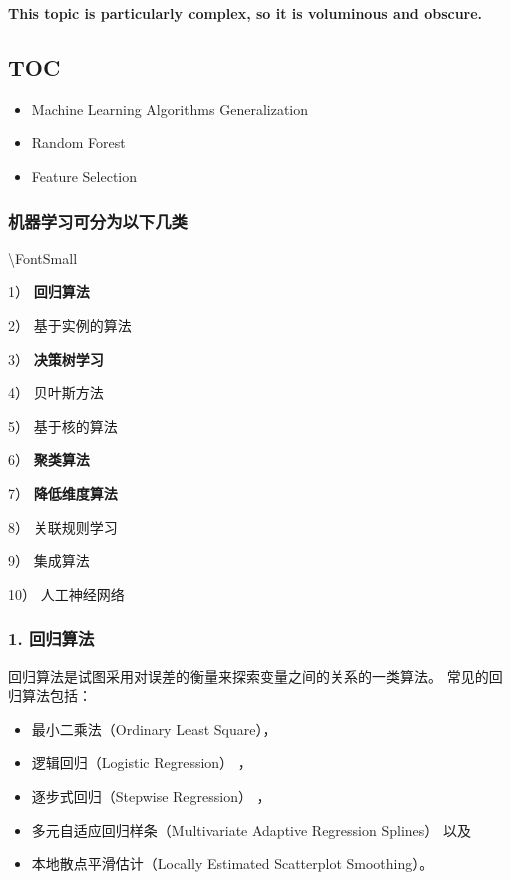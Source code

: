 \documentclass[
]{article}
\begin{document}
\textbf{This topic is particularly complex, so it is voluminous and
obscure.}

\hypertarget{toc-4}{%
\subsection{TOC}\label{toc-4}}

\begin{itemize}
\item
  Machine Learning Algorithms Generalization
\item
  Random Forest
\item
  Feature Selection
\end{itemize}

\hypertarget{ux673aux5668ux5b66ux4e60ux53efux5206ux4e3aux4ee5ux4e0bux51e0ux7c7b}{%
\subsubsection{机器学习可分为以下几类}\label{ux673aux5668ux5b66ux4e60ux53efux5206ux4e3aux4ee5ux4e0bux51e0ux7c7b}}

\textbackslash FontSmall

1） \textbf{回归算法}

2） 基于实例的算法

3） \textbf{决策树学习}

4） 贝叶斯方法

5） 基于核的算法

6） \textbf{聚类算法}

7） \textbf{降低维度算法}

8） 关联规则学习

9） 集成算法

10） 人工神经网络

\hypertarget{1-ux56deux5f52ux7b97ux6cd5}{%
\subsubsection{1. 回归算法}\label{1-ux56deux5f52ux7b97ux6cd5}}

回归算法是试图采用对误差的衡量来探索变量之间的关系的一类算法。
常见的回归算法包括：

\begin{itemize}
\item
  最小二乘法（Ordinary Least Square），
\item
  逻辑回归（Logistic Regression） ，
\item
  逐步式回归（Stepwise Regression） ，
\item
  多元自适应回归样条（Multivariate Adaptive Regression Splines） 以及
\item
  本地散点平滑估计（Locally Estimated Scatterplot Smoothing）。
\end{itemize}
\end{document}
